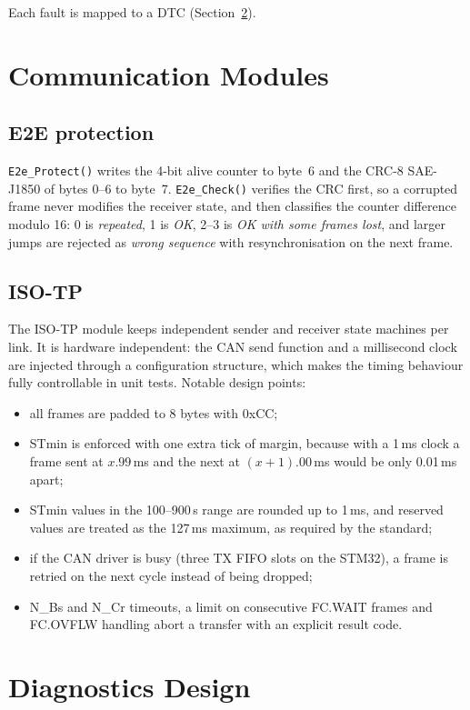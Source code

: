 Each fault is mapped to a DTC (Section~\ref{sec:diag_design}).

\section{Communication Modules}

\subsection{E2E protection}

\texttt{E2e\_Protect()} writes the 4-bit alive counter to byte~6 and the CRC-8 SAE-J1850 of bytes 0--6 to byte~7. \texttt{E2e\_Check()} verifies the CRC first, so a corrupted frame never modifies the receiver state, and then classifies the counter difference modulo 16: 0 is \textit{repeated}, 1 is \textit{OK}, 2--3 is \textit{OK with some frames lost}, and larger jumps are rejected as \textit{wrong sequence} with resynchronisation on the next frame.

\subsection{ISO-TP}

The ISO-TP module keeps independent sender and receiver state machines per link. It is hardware independent: the CAN send function and a millisecond clock are injected through a configuration structure, which makes the timing behaviour fully controllable in unit tests. Notable design points:
\begin{itemize}[nosep]
  \item all frames are padded to 8 bytes with 0xCC;
  \item STmin is enforced with one extra tick of margin, because with a 1\,ms clock a frame sent at $x.99$\,ms and the next at $(x+1).00$\,ms would be only 0.01\,ms apart;
  \item STmin values in the 100--900\,\textmu s range are rounded up to 1\,ms, and reserved values are treated as the 127\,ms maximum, as required by the standard;
  \item if the CAN driver is busy (three TX FIFO slots on the STM32), a frame is retried on the next cycle instead of being dropped;
  \item N\_Bs and N\_Cr timeouts, a limit on consecutive FC.WAIT frames and FC.OVFLW handling abort a transfer with an explicit result code.
\end{itemize}

\section{Diagnostics Design}
\label{sec:diag_design}

